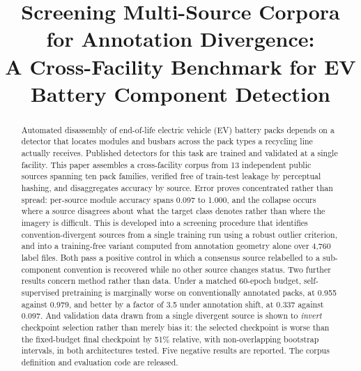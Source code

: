 \documentclass[conference]{IEEEtran}
\newcommand\blfootnote[1]{%
  \begingroup\renewcommand\thefootnote{}\footnote{#1}\addtocounter{footnote}{-1}\endgroup}
\newif\ifanon\anonfalse
\begin{document}
\title{Screening Multi-Source Corpora for Annotation Divergence:\\
A Cross-Facility Benchmark for EV Battery Component Detection}

\ifanon
\author{\IEEEauthorblockN{Anonymous Author(s)}
\IEEEauthorblockA{\textit{Affiliation withheld for double-blind review}}}
\else
\author{
}
\fi

\maketitle
\ifanon\blfootnote{Benchmark definition, provenance and licence record, audit tooling, evaluation code and detector weights are publicly available; the repository URL is withheld during double-blind review.}\else{}\fi

\begin{abstract}
Automated disassembly of end-of-life electric vehicle (EV) battery packs depends on a
detector that locates modules and busbars across the pack types a recycling line
actually receives. Published detectors for this task are trained and validated at a
single facility. This paper assembles a cross-facility corpus from 13 independent
public sources spanning ten pack families, verified free of train-test leakage by
perceptual hashing, and disaggregates accuracy by source. Error proves concentrated
rather than spread: per-source module accuracy spans 0.097 to 1.000, and the collapse
occurs where a source disagrees about what the target class denotes rather than where
the imagery is difficult. This is developed into a screening procedure that identifies
convention-divergent sources from a single training run using a robust outlier
criterion, and into a training-free variant computed from annotation geometry alone
over 4,760 label files. Both pass a positive control in which a consensus source
relabelled to a sub-component convention is recovered while no other source changes
status. Two further results concern method rather than data. Under a matched 60-epoch
budget, self-supervised pretraining is marginally worse on conventionally annotated
packs, at 0.955 against 0.979, and better by a factor of 3.5 under annotation shift,
at 0.337 against 0.097. And validation data drawn from a single divergent source is
shown to \emph{invert} checkpoint selection rather than merely bias it: the selected
checkpoint is worse than the fixed-budget final checkpoint by 51\% relative, with
non-overlapping bootstrap intervals, in both architectures tested. Five negative
results are reported. The corpus definition and evaluation code are released.
\end{abstract}
\end{document}
